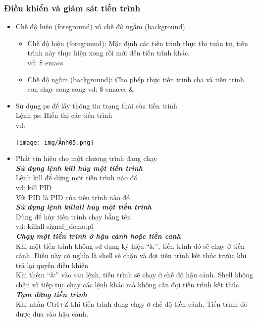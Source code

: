 \documentclass[12pt,a4paper]{article}
\begin{document}
\subsubsection{Điều khiển và giám sát tiến trình}
\begin{itemize}
	\item Chế độ hiện (foreground) và chế độ ngầm (background)
	\begin{itemize}
		\item Chế độ hiện (foreground): Mặc định các tiến trình thực thi tuần tự, tiến trình này thực hiện xong rồi mới đến tiến trình khác.\\
		vd: \$ emacs
		\item Chế độ ngầm (background): Cho phép thực tiến trình cha và tiến trình con chạy song song
		vd:  \$ emaccs \&
	\end{itemize}
	\item Sử dụng ps để lấy thông tin trạng thái của tiến trình\\
	Lệnh ps: Hiển thị các tiến trình \\
	vd: 
	\begin{center}
		\texttt{[image: img/Ảnh05.png]}
	\end{center}
	\item Phát tín hiệu cho một chương trình đang chạy\\
	\textbf{\textit{Sử dụng lệnh kill hủy một tiến trình}}\\
	Lệnh kill để dừng một tiến trình nào đó\\
	vd: kill PID\\
	Với PID là PID của tiến trình nào đó\\
	\textbf{\textit{Sử dụng lệnh killall hủy một tiến trình}}\\
	Dùng để hủy tiến trình chạy bằng tên \\
	vd: killall signal\_demo.pl\\
	\textbf{\textit{Chạy một tiến trình ở hậu cảnh hoặc tiền cảnh}}\\
	Khi một tiến trình không sử dụng ký hiệu “\&”, tiến trình đó sẽ chạy ở tiền cảnh. Điều này có nghĩa là shell sẽ chặn và đợi tiến trình kết thúc trước khi trả lại quyền điều khiển\\
	Khi thêm “\&” vào sau lệnh, tiến trình sẽ chạy ở chế độ hậu cảnh. Shell không chặn và tiếp tục chạy các lệnh khác mà không cần đợi tiến trình kết thúc.\\
	\textbf{\textit{Tạm dừng tiến trình}}\\
	Khi nhấn Ctrl+Z khi tiến trình đang chạy ở chế độ tiền cảnh. Tiến trình đó được đưa vào hậu cảnh.\\

\end{itemize}
\end{document}
